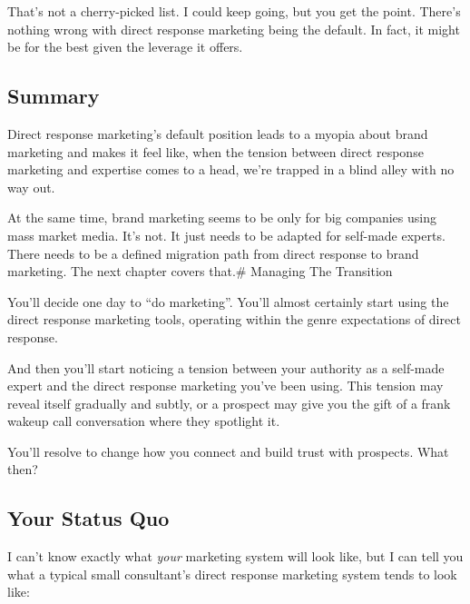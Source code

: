 \documentclass[13pt,]{tufte-handout}
\begin{document}
That's not a cherry-picked list. I could keep going, but you get the
point. There's nothing wrong with direct response marketing being the
default. In fact, it might be for the best given the leverage it offers.

\hypertarget{summary-3}{%
\subsection{Summary}\label{summary-3}}

Direct response marketing's default position leads to a myopia about
brand marketing and makes it feel like, when the tension between direct
response marketing and expertise comes to a head, we're trapped in a
blind alley with no way out.

At the same time, brand marketing seems to be only for big companies
using mass market media. It's not. It just needs to be adapted for
self-made experts. There needs to be a defined migration path from
direct response to brand marketing. The next chapter covers that.\#
Managing The Transition

You'll decide one day to ``do marketing''. You'll almost certainly start
using the direct response marketing tools, operating within the genre
expectations of direct response.

And then you'll start noticing a tension between your authority as a
self-made expert and the direct response marketing you've been using.
This tension may reveal itself gradually and subtly, or a prospect may
give you the gift of a frank wakeup call conversation where they
spotlight it.

You'll resolve to change how you connect and build trust with prospects.
What then?

\hypertarget{your-status-quo}{%
\subsection{Your Status Quo}\label{your-status-quo}}

I can't know exactly what \emph{your} marketing system will look like,
but I can tell you what a typical small consultant's direct response
marketing system tends to look like:
\end{document}
